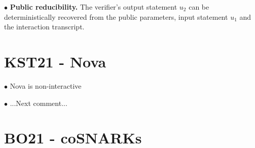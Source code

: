 \medskip
$\bullet$ \textbf{Public reducibility.} The verifier's output statement $u_2$
can be deterministically recovered from the public parameters, input statement
$u_1$ and the interaction transcript.

\section{KST21 - Nova}
$\bullet$ Nova is non-interactive

\medskip
$\bullet$ ...Next comment...

\section{BO21 - coSNARKs}



